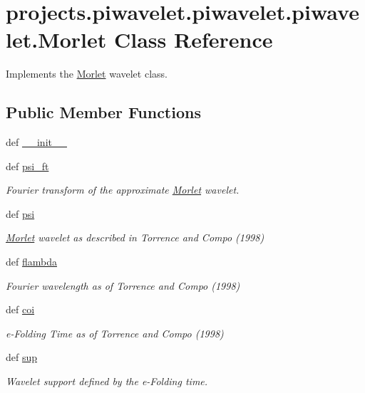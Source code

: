 \hypertarget{classprojects_1_1piwavelet_1_1piwavelet_1_1piwavelet_1_1Morlet}{\section{projects.\-piwavelet.\-piwavelet.\-piwavelet.\-Morlet Class Reference}
\label{classprojects_1_1piwavelet_1_1piwavelet_1_1piwavelet_1_1Morlet}
}


Implements the \hyperlink{classprojects_1_1piwavelet_1_1piwavelet_1_1piwavelet_1_1Morlet}{Morlet} wavelet class.  


\subsection*{Public Member Functions}
\begin{DoxyCompactItemize}
\item 
def \hyperlink{classprojects_1_1piwavelet_1_1piwavelet_1_1piwavelet_1_1Morlet_ab760a09804e137e9a32e2ad48d18534d}{\-\_\-\-\_\-init\-\_\-\-\_\-}
\item 
def \hyperlink{classprojects_1_1piwavelet_1_1piwavelet_1_1piwavelet_1_1Morlet_a37cfc735b02505abd70c04a1c7351089}{psi\-\_\-ft}
\begin{DoxyCompactList}\small\item\em Fourier transform of the approximate \hyperlink{classprojects_1_1piwavelet_1_1piwavelet_1_1piwavelet_1_1Morlet}{Morlet} wavelet. \end{DoxyCompactList}\item 
def \hyperlink{classprojects_1_1piwavelet_1_1piwavelet_1_1piwavelet_1_1Morlet_a6c0b58fcfcb975415aac3f0700d45648}{psi}
\begin{DoxyCompactList}\small\item\em \hyperlink{classprojects_1_1piwavelet_1_1piwavelet_1_1piwavelet_1_1Morlet}{Morlet} wavelet as described in Torrence and Compo (1998) \end{DoxyCompactList}\item 
def \hyperlink{classprojects_1_1piwavelet_1_1piwavelet_1_1piwavelet_1_1Morlet_ab813d6681d15b31660077e7530936b25}{flambda}
\begin{DoxyCompactList}\small\item\em Fourier wavelength as of Torrence and Compo (1998) \end{DoxyCompactList}\item 
def \hyperlink{classprojects_1_1piwavelet_1_1piwavelet_1_1piwavelet_1_1Morlet_a839779e708cefd79d0944edd0417db79}{coi}
\begin{DoxyCompactList}\small\item\em e-\/\-Folding Time as of Torrence and Compo (1998) \end{DoxyCompactList}\item 
def \hyperlink{classprojects_1_1piwavelet_1_1piwavelet_1_1piwavelet_1_1Morlet_a969cc0885f3ff4158ad387e7243f4493}{sup}
\begin{DoxyCompactList}\small\item\em Wavelet support defined by the e-\/\-Folding time. \end{DoxyCompactList}\end{DoxyCompactItemize}

